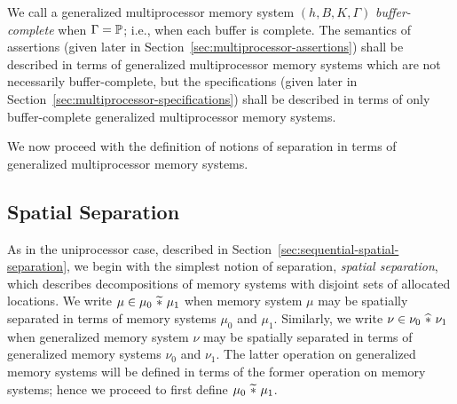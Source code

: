 \documentclass[11pt]{report}         %
\begin{document}
We call a generalized multiprocessor memory system $(h,B,K,\Gamma)$ \emph{buffer-complete} when $\Gamma = \mathbb{P}$; i.e., when each buffer is complete. The semantics of assertions (given later in Section~\ref{sec:multiprocessor-assertions}) shall be described in terms of generalized multiprocessor memory systems which are not necessarily buffer-complete, but the specifications (given later in Section~\ref{sec:multiprocessor-specifications}) shall be described in terms of only buffer-complete generalized multiprocessor memory systems.

We now proceed with the definition of notions of separation in terms of generalized multiprocessor memory systems. 

\subsection{Spatial Separation}
\label{sec:spatial-separation}

As in the uniprocessor case, described in Section~\ref{sec:sequential-spatial-separation}, we begin with the simplest notion of separation, \emph{spatial separation}, which describes decompositions of memory systems with disjoint sets of allocated locations. We write $\mu \in \mu_0 \operatorname{\,\widetilde{\ast}\,} \mu_1$ when memory system $\mu$ may be spatially separated in terms of memory systems $\mu_0$ and $\mu_1$. Similarly, we write $\nu \in \nu_0 \operatorname{\,\widehat{\ast}\,} \nu_1$ when generalized memory system $\nu$ may be spatially separated in terms of generalized memory systems $\nu_0$ and $\nu_1$. The latter operation on generalized memory systems will be defined in terms of the former operation on memory systems; hence we proceed to first define $\mu_0 \operatorname{\,\widetilde{\ast}\,} \mu_1$. 
\end{document}
